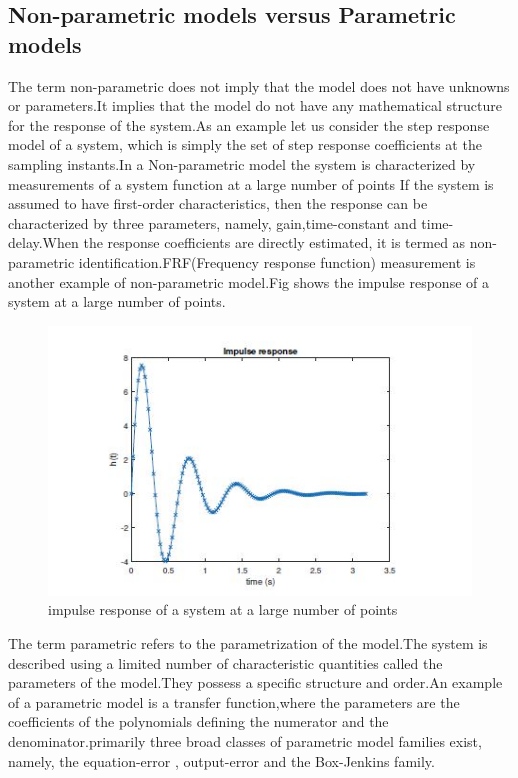 \documentclass[a4paper,12pt]{report}
\numberwithin{equation}{section}
\begin{document}
\subsection*{ Non-parametric models versus Parametric models }
The term non-parametric does not imply that the model does not have unknowns or parameters.It implies that the model do not have any mathematical structure for the response of the system.As an example let us consider the step response model of a system, which is simply the set of step response coefficients at the sampling instants.In a Non-parametric model the system is characterized by measurements of a system function at a large number of points If the system is assumed to have first-order characteristics, then the response can be characterized by three parameters, namely, gain,time-constant and time-delay.When the response coefficients are directly estimated, it is termed as non-parametric identification.FRF(Frequency response function) measurement is another example of non-parametric model.Fig shows the impulse response of a system at a large number of points.

\begin{figure}[H]
    \includegraphics[scale=1]{impulse_response.JPG}
    \centering
    \caption{impulse response of a system at a large number of points}
    \label{fig:imp_res}
\end{figure}


The term parametric refers to the parametrization of the model.The system is described using a limited number of characteristic quantities called the parameters of the model.They possess a  specific structure and order.An example of a parametric model is a transfer function,where the parameters are the coefficients of the polynomials defining the numerator and the denominator.primarily three broad classes of parametric model families exist,
namely, the equation-error , output-error and the Box-Jenkins family.
\end{document}
